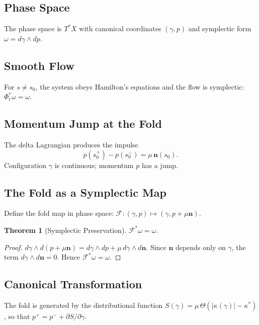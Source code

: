 \documentclass[14pt,a4paper]{extarticle}
\newtheorem{theorem}{Theorem}[section]
\begin{document}
\subsection{Phase Space}

The phase space is $T^*X$ with canonical coordinates $(\gamma, p)$
and symplectic form $\omega = d\gamma \wedge dp$.

\subsection{Smooth Flow}

For $s \neq s_0$, the system obeys Hamilton's equations and the flow
is symplectic: $\Phi_t^*\omega = \omega$.

\subsection{Momentum Jump at the Fold}

The delta Lagrangian produces the impulse
\[
  p(s_0^+) - p(s_0^-) = \mu\,\mathbf{n}(s_0).
\]
Configuration $\gamma$ is continuous; momentum $p$ has a jump.

\subsection{The Fold as a Symplectic Map}

Define the fold map in phase space:
$\mathcal{F} : (\gamma, p) \mapsto (\gamma, p + \mu\mathbf{n})$.

\begin{theorem}[Symplectic Preservation]
\label{thm:symplectic}
$\mathcal{F}^*\omega = \omega$.
\end{theorem}

\begin{proof}
$d\gamma \wedge d(p + \mu\mathbf{n}) = d\gamma \wedge dp +
\mu\,d\gamma \wedge d\mathbf{n}$.
Since $\mathbf{n}$ depends only on $\gamma$, the term
$d\gamma \wedge d\mathbf{n} = 0$.
Hence $\mathcal{F}^*\omega = \omega$.
\end{proof}

\subsection{Canonical Transformation}

The fold is generated by the distributional function
$S(\gamma) = \mu\,\Theta(|\kappa(\gamma)| - \kappa^*)$,
so that $p^+ = p^- + \partial S/\partial\gamma$.
\end{document}
